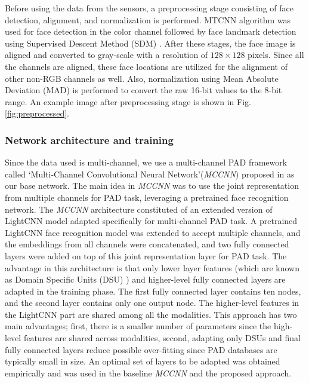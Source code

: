 \documentclass[journal]{IEEEtran}
\begin{document}
Before using the data from the sensors, a preprocessing stage consisting of face detection, alignment, and normalization is performed. MTCNN algorithm \cite{zhang2016joint} was used for face detection in the color channel followed by face landmark detection using Supervised Descent Method (SDM) \cite{xiong2013supervised}. After these stages, the face image is aligned and converted to gray-scale with a resolution of $128 \times 128$ pixels. Since all the channels are aligned, these face locations are utilized for the alignment of other non-RGB channels as well. Also, normalization using  Mean Absolute Deviation (MAD) \cite{leys2013detecting} is performed to convert the raw 16-bit values to the 8-bit range. An example image after preprocessing stage is shown in Fig. \ref{fig:preprocessed}.
\subsubsection{Network architecture and training}

Since the data used is multi-channel, we use a multi-channel PAD framework called  `Multi-Channel Convolutional Neural Network'(\textit{MCCNN}) proposed in \cite{george_mccnn_tifs2019} as our base network. The main idea in \textit{MCCNN} was to use the joint representation from multiple channels for PAD task, leveraging a pretrained face recognition network. The \textit{MCCNN} architecture constituted of an extended version of LightCNN model \cite{wu2018light} adapted specifically for multi-channel PAD task. A pretrained LightCNN face recognition model was extended to accept multiple channels, and the embeddings from all channels were concatenated, and two fully connected layers were added on top of this joint representation layer for PAD task. The advantage in this architecture is that only lower layer features (which are known as Domain Specific Units (DSU) \cite{freitas2018heterogeneous} ) and higher-level fully connected layers are adapted in the training phase. The first fully connected layer contains ten nodes, and the second layer contains only one output node. The higher-level features in the LightCNN part are shared among all the modalities. This approach has two main advantages; first, there is a smaller number of parameters since the high-level features are shared across modalities, second, adapting only DSUs and final fully connected layers reduce possible over-fitting since PAD databases are typically small in size. An optimal set of layers to be adapted was obtained empirically and was used in the baseline \textit{MCCNN} and the proposed approach.
\end{document}
